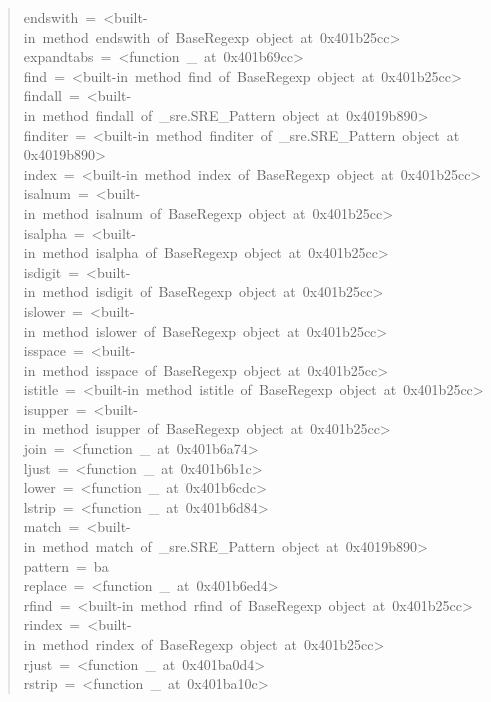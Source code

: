 \documentclass[10pt,english]{article}
\begin{document}
\begin{quote}
\begin{ttfamily}
\begin{flushleft}
\mbox{endswith~=~<built-in~method~endswith~of~BaseRegexp~object~at~0x401b25cc>}\\
\mbox{expandtabs~=~<function~{\_}~at~0x401b69cc>}\\
\mbox{find~=~<built-in~method~find~of~BaseRegexp~object~at~0x401b25cc>}\\
\mbox{findall~=~<built-in~method~findall~of~{\_}sre.SRE{\_}Pattern~object~at~0x4019b890>}\\
\mbox{finditer~=~<built-in~method~finditer~of~{\_}sre.SRE{\_}Pattern~object~at~}\\
\mbox{0x4019b890>}\\
\mbox{index~=~<built-in~method~index~of~BaseRegexp~object~at~0x401b25cc>}\\
\mbox{isalnum~=~<built-in~method~isalnum~of~BaseRegexp~object~at~0x401b25cc>}\\
\mbox{isalpha~=~<built-in~method~isalpha~of~BaseRegexp~object~at~0x401b25cc>}\\
\mbox{isdigit~=~<built-in~method~isdigit~of~BaseRegexp~object~at~0x401b25cc>}\\
\mbox{islower~=~<built-in~method~islower~of~BaseRegexp~object~at~0x401b25cc>}\\
\mbox{isspace~=~<built-in~method~isspace~of~BaseRegexp~object~at~0x401b25cc>}\\
\mbox{istitle~=~<built-in~method~istitle~of~BaseRegexp~object~at~0x401b25cc>}\\
\mbox{isupper~=~<built-in~method~isupper~of~BaseRegexp~object~at~0x401b25cc>}\\
\mbox{join~=~<function~{\_}~at~0x401b6a74>}\\
\mbox{ljust~=~<function~{\_}~at~0x401b6b1c>}\\
\mbox{lower~=~<function~{\_}~at~0x401b6cdc>}\\
\mbox{lstrip~=~<function~{\_}~at~0x401b6d84>}\\
\mbox{match~=~<built-in~method~match~of~{\_}sre.SRE{\_}Pattern~object~at~0x4019b890>}\\
\mbox{pattern~=~ba}\\
\mbox{replace~=~<function~{\_}~at~0x401b6ed4>}\\
\mbox{rfind~=~<built-in~method~rfind~of~BaseRegexp~object~at~0x401b25cc>}\\
\mbox{rindex~=~<built-in~method~rindex~of~BaseRegexp~object~at~0x401b25cc>}\\
\mbox{rjust~=~<function~{\_}~at~0x401ba0d4>}\\
\mbox{rstrip~=~<function~{\_}~at~0x401ba10c>}\\

\end{flushleft}
\end{ttfamily}
\end{quote}
\end{document}
